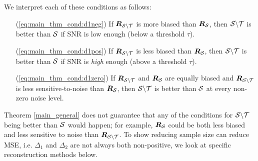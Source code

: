 We interpret each of these conditions as follows:
\begin{enumerate}
    \item[(\ref{eq:main_thm_cond:d1neg})]
    If $\bm{R}_{\mathcal{S} \backslash \mathcal{T}}$ is more biased than $\bm{R}_{\mathcal{S}}$, then $\mathcal{S} \backslash \mathcal{T}$ is better than $\mathcal{S}$ if SNR is low enough (below a threshold $\tau$).
    \item[(\ref{eq:main_thm_cond:d1pos})] 
    If $\bm{R}_{\mathcal{S} \backslash \mathcal{T}}$ is less biased than $\bm{R}_{\mathcal{S}}$, then $\mathcal{S} \backslash \mathcal{T}$ is better than $\mathcal{S}$ if SNR is \emph{high} enough (above a threshold $\tau$).
    \item[(\ref{eq:main_thm_cond:d1zero})]
    If $\bm{R}_{\mathcal{S}\backslash\mathcal{T}}$ and $\bm{R}_{\mathcal{S}}$ are equally biased and $\bm{R}_{\mathcal{S} \backslash \mathcal{T}}$ is less sensitive-to-noise than $\bm{R}_{\mathcal{S}}$, then $\mathcal{S} \backslash \mathcal{T}$ is better than $\mathcal{S}$ at every non-zero noise level.
\end{enumerate}
Theorem \ref{main_general} does not guarantee that any of the conditions for $\mathcal{S} \backslash \mathcal{T}$ being better than $\mathcal{S}$ would happen; for example, $\bm{R}_{\mathcal{S}}$ could be both less biased and less sensitive to noise than $\bm{R}_{\mathcal{S} \backslash \mathcal{T}}$. To show reducing sample size can reduce MSE, i.e. $\Delta_{1}$ and $\Delta_{2}$ are not always both non-positive, we look at specific reconstruction methods below.

